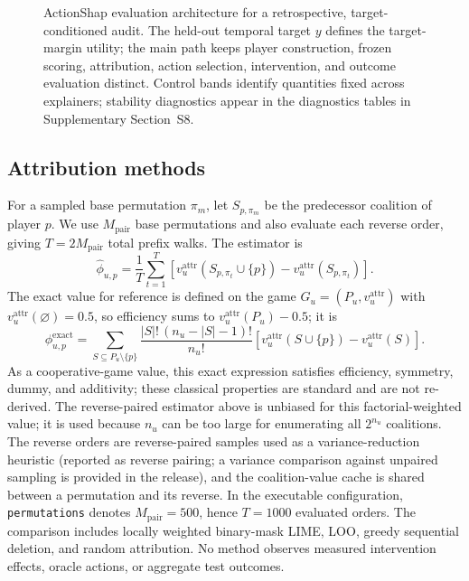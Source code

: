 \documentclass[a4paper,fleqn,doubleblind]{cas-sc}
\begin{document}
\begin{figure}[pos=htbp,abovecap=4pt,belowcap=0pt,abovefig=0pt,belowfig=0pt]
\caption{ActionShap evaluation architecture for a retrospective, target-conditioned audit. The held-out temporal target $y$ defines the target-margin utility; the main path keeps player construction, frozen scoring, attribution, action selection, intervention, and outcome evaluation distinct. Control bands identify quantities fixed across explainers; stability diagnostics appear in the diagnostics tables in Supplementary Section~S8.}
\label{fig:architecture}
\end{figure}

\subsection{Attribution methods}
For a sampled base permutation $\pi_m$, let $S_{p,\pi_m}$ be the predecessor coalition of player $p$. We use $M_{\mathrm{pair}}$ base permutations and also evaluate each reverse order, giving $T=2M_{\mathrm{pair}}$ total prefix walks. The estimator is
\begin{equation}
\widehat\phi_{u,p}=\frac{1}{T}\sum_{t=1}^{T}\left[v_u^{\mathrm{attr}}(S_{p,\pi_t}\cup\{p\})-v_u^{\mathrm{attr}}(S_{p,\pi_t})\right].
\end{equation}
The exact value for reference is defined on the game $G_u=(P_u,v_u^{\mathrm{attr}})$ with $v_u^{\mathrm{attr}}(\varnothing)=0.5$, so efficiency sums to $v_u^{\mathrm{attr}}(P_u)-0.5$; it is
\begin{equation}
\phi^{\mathrm{exact}}_{u,p}=
\sum_{S\subseteq P_u\setminus\{p\}}
\frac{|S|!\,(n_u-|S|-1)!}{n_u!}
\left[v_u^{\mathrm{attr}}(S\cup\{p\})-v_u^{\mathrm{attr}}(S)\right].
\label{eq:exact-shapley}
\end{equation}
As a cooperative-game value, this exact expression satisfies efficiency, symmetry, dummy, and additivity; these classical properties are standard and are not re-derived. The reverse-paired estimator above is unbiased for this factorial-weighted value; it is used because $n_u$ can be too large for enumerating all $2^{n_u}$ coalitions. The reverse orders are reverse-paired samples used as a variance-reduction heuristic (reported as reverse pairing; a variance comparison against unpaired sampling is provided in the release), and the coalition-value cache is shared between a permutation and its reverse. In the executable configuration, \texttt{permutations} denotes $M_{\mathrm{pair}}=500$, hence $T=1000$ evaluated orders. The comparison includes locally weighted binary-mask LIME, LOO, greedy sequential deletion, and random attribution. No method observes measured intervention effects, oracle actions, or aggregate test outcomes.
\end{document}
